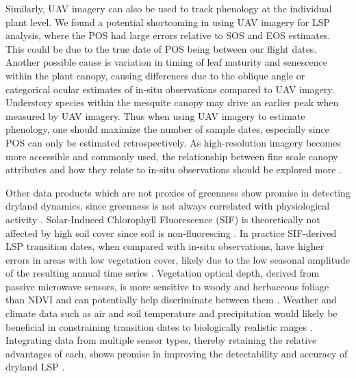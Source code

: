 \documentclass{article}
\begin{document}
Similarly, UAV imagery can also be used to track phenology at the individual plant level. We found a potential shortcoming in using UAV imagery for LSP analysis, where the POS had large errors relative to SOS and EOS estimates. This could be due to the true date of POS being between our flight dates. Another possible cause is variation in timing of leaf maturity and senescence within the plant canopy, causing differences due to the oblique angle or categorical ocular estimates of in-situ observations compared to UAV imagery. Understory species within the mesquite canopy may drive an earlier peak when measured by UAV imagery. Thus when using UAV imagery to estimate phenology, one should maximize the number of sample dates, especially since POS can only be estimated retrospectively. As high-resolution imagery becomes more accessible and commonly used, the relationship between fine scale canopy attributes and how they relate to in-situ observations should be explored more \cite{klosterman2018, cheng-vrieling2020}. 

Other data products which are not proxies of greenness show promise in detecting dryland dynamics, since greenness is not always correlated with physiological activity \cite{jeong-schimel2017}. Solar‐Induced Chlorophyll Fluorescence (SIF) is theoretically not affected by high soil cover since soil is non-fluorescing \cite{frankenberg2014, smith2018}. In practice SIF-derived LSP transition dates, when compared with in-situ observations, have higher errors in areas with low vegetation cover, likely due to the low seasonal amplitude of the resulting annual time series \cite{wang-beringer2019}. Vegetation optical depth, derived from passive microwave sensors, is more sensitive to woody and herbaceous foliage than NDVI and can potentially help discriminate between them \cite{andela2013, tian2016}. Weather and climate data such as air and soil temperature and precipitation would likely be beneficial in constraining transition dates to biologically realistic ranges \cite{hudson2011, liu-liu2014, norris2020}. Integrating data from multiple sensor types, thereby retaining the relative advantages of each, shows promise in improving the detectability and accuracy of dryland LSP \cite{andela2013, tian2016, wang-xiao2019, dannenberg2020}.
\end{document}
